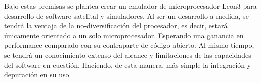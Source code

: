 Bajo estas premisas se plantea crear un emulador de microprocesador Leon3 para desarrollo de software satelital y simuladores. Al ser un desarrollo a medida, se tendrá la ventaja de la no-diversificación del procesador, es decir, estará únicamente orientado a un solo microprocesador. Esperando una ganancia en performance comparado con su contraparte de código abierto. Al mismo tiempo, se tendrá un conocimiento extenso del alcance y limitaciones de las capacidades del software en cuestión. Haciendo, de esta manera, más simple la integración y depuración en su uso.

















